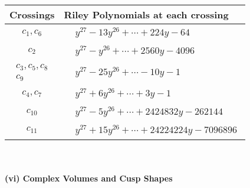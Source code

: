 \documentclass[1p]{elsarticle_modified}
\theoremstyle{definition}
\begin{document}
\begin{tabular}{m{50pt}|m{274pt}}
Crossings & \hspace{64pt}Riley Polynomials at each crossing \\
\hline $$\begin{aligned}c_{1},c_{6}\end{aligned}$$&$\begin{aligned}
&y^{27}-13 y^{26}+\cdots+224 y-64
\end{aligned}$\\
\hline $$\begin{aligned}c_{2}\end{aligned}$$&$\begin{aligned}
&y^{27}- y^{26}+\cdots+2560 y-4096
\end{aligned}$\\
\hline $$\begin{aligned}c_{3},c_{5},c_{8}\\c_{9}\end{aligned}$$&$\begin{aligned}
&y^{27}-25 y^{26}+\cdots-10 y-1
\end{aligned}$\\
\hline $$\begin{aligned}c_{4},c_{7}\end{aligned}$$&$\begin{aligned}
&y^{27}+6 y^{26}+\cdots+3 y-1
\end{aligned}$\\
\hline $$\begin{aligned}c_{10}\end{aligned}$$&$\begin{aligned}
&y^{27}-5 y^{26}+\cdots+2424832 y-262144
\end{aligned}$\\
\hline $$\begin{aligned}c_{11}\end{aligned}$$&$\begin{aligned}
&y^{27}+15 y^{26}+\cdots+24224224 y-7096896
\end{aligned}$\\
\hline
\end{tabular}\\~\\
\newpage\flushleft \textbf{(vi) Complex Volumes and Cusp Shapes}
\end{document}
